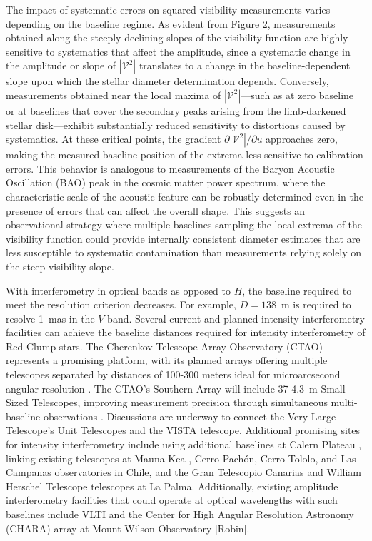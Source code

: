 \documentclass[linenumbers,trackchanges,margins]{aastex701}
\begin{document}
The impact of systematic errors on squared visibility measurements varies  depending on the baseline regime. As evident from Figure 2, measurements obtained along the steeply declining slopes of the visibility function are highly sensitive to systematics that affect the amplitude, since a systematic change in the amplitude or slope of $|\mathcal{V}^2|$ translates to a change in the baseline-dependent slope upon which the stellar diameter determination depends. Conversely, measurements obtained near the local maxima of  $|\mathcal{V}^2|$—such as at zero baseline or at baselines that
cover the secondary peaks arising from the limb-darkened stellar disk—exhibit substantially reduced sensitivity to distortions caused by systematics. At these critical points, the gradient $\partial |\mathcal{V}^2|/\partial u$ approaches zero, making the measured baseline position of the extrema less sensitive to calibration errors. This behavior is analogous to measurements of the Baryon Acoustic Oscillation (BAO) peak in the cosmic matter power spectrum, where the characteristic scale of the acoustic feature can be robustly determined even in the presence of errors that can affect the overall shape. This suggests an observational strategy where multiple baselines sampling the local extrema of the visibility function could provide internally consistent diameter estimates that are less susceptible to systematic contamination than measurements relying solely on the steep visibility slope.

With interferometry in optical bands as opposed to $H$, the baseline required to meet
the resolution criterion decreases.   For example, $D=138$~m is
required to resolve 1~mas in the $V$-band.
Several current and planned intensity interferometry facilities can achieve the baseline distances required for intensity interferometry of Red Clump stars. The Cherenkov Telescope Array Observatory (CTAO) represents a promising platform, with its planned arrays offering multiple telescopes separated by distances of 100-300 meters ideal for microarcsecond angular resolution \citep{2024SPIE13095E..27C}. The CTAO's Southern Array will include 37 4.3~m Small-Sized Telescopes,  improving measurement precision through simultaneous multi-baseline observations \citep{2024MNRAS.529.4387A}. 
Discussions are underway to connect the Very Large Telescope's Unit Telescopes and the VISTA telescope.
Additional promising sites for intensity interferometry include using additional baselines at Calern
Plateau \citep{2022SPIE12183E..0GM}, linking existing telescopes
at Mauna Kea \citep{presentation_kaiser},
Cerro Pach\'{o}n, Cerro Tololo, and Las Campanas observatories in Chile, and the  Gran Telescopio Canarias and William Herschel Telescope telescopes at La Palma.
Additionally, existing amplitude interferometry facilities that could operate at optical wavelengths with such baselines include VLTI and the Center for High Angular Resolution Astronomy (CHARA) array at Mount Wilson Observatory \citep{2005ApJ...628..453T,2020SPIE11446E..05S} [Robin].
\end{document}
